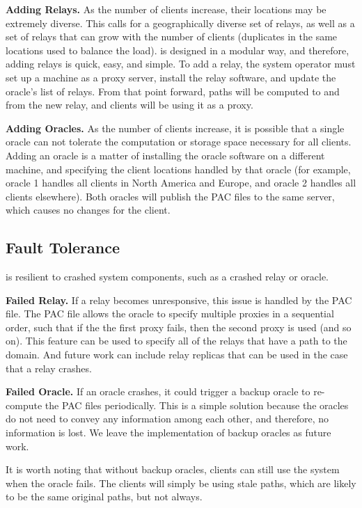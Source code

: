 {\bf Adding Relays.} As the number of clients increase, their locations may be 
extremely diverse. This calls for a geographically diverse set of relays, as 
well as a set of relays that can grow with the number of clients (duplicates in 
the same locations used to balance the load).  \system{} is 
designed in a modular way, and therefore, adding relays is quick, easy, and 
simple.  To add a relay, the system operator must set up a machine as a proxy 
server, install the \system{} relay software, and update the oracle's list of 
relays.  From that point forward, paths will be computed to and from the new 
relay, and clients will be using it as a proxy.  

{\bf Adding Oracles.} As the number of clients increase, it is possible that a 
single oracle can not tolerate the computation or storage space necessary for 
all clients.  Adding an oracle is a matter of installing the oracle software on 
a different machine, and specifying the client locations handled by that oracle 
(for example, oracle 1 handles all clients in North America and Europe, and 
oracle 2 handles all clients elsewhere).  Both oracles will publish the PAC files 
to the same server, which causes no changes for the client.

\subsection{Fault Tolerance}
\system{} is resilient to crashed system components, such as a crashed relay or 
oracle.  

{\bf Failed Relay.} If a relay becomes unresponsive, this issue is handled by 
the PAC file.  The PAC file allows the oracle to specify multiple proxies in 
a sequential order, such that if the the first proxy fails, then the second 
proxy is used (and so on).  This feature can be used to specify all of the 
relays that have a path to the domain.  And future work can include relay 
replicas that can be used in the case that a relay crashes.

{\bf Failed Oracle.} If an oracle crashes, it could trigger a backup oracle 
to re-compute the PAC files periodically.  This is a simple solution because 
the oracles do not need to convey any information among each other, and therefore, 
no information is lost.  We leave the implementation of backup oracles as future 
work.

It is worth noting that without backup oracles, clients can still use the system 
when the oracle fails.  The clients will simply be using stale paths, which are 
likely to be the same original paths, but not always.  

